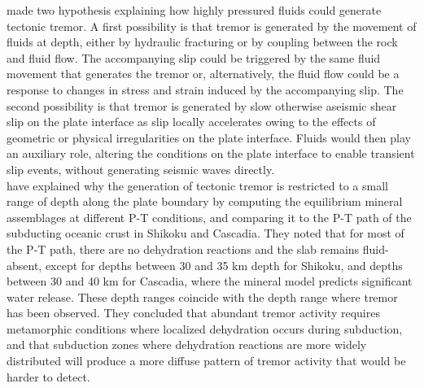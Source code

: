 \documentclass[draft]{agujournal2019}
\begin{document}
 made two hypothesis explaining how highly pressured fluids could generate tectonic tremor. A first possibility is that tremor is generated by the movement of fluids at depth, either by hydraulic fracturing or by coupling between the rock and fluid flow. The accompanying slip could be triggered by the same fluid movement that generates the tremor or, alternatively, the fluid flow could be a response to changes in stress and strain induced by the accompanying slip. The second possibility is that tremor is generated by slow otherwise aseismic shear slip on the plate interface as slip locally accelerates owing to the effects of geometric or physical irregularities on the plate interface. Fluids would then play an auxiliary role, altering the conditions on the plate interface to enable transient slip events, without generating seismic waves directly. \\

 have explained why the generation of tectonic tremor is restricted to a small range of depth along the plate boundary by computing the equilibrium mineral assemblages at different P-T conditions, and comparing it to the P-T path of the subducting oceanic crust in Shikoku and Cascadia. They noted that for most of the P-T path, there are no dehydration reactions and the slab remains fluid-absent, except for depths between 30 and 35 km depth for Shikoku, and depths between 30 and 40 km for Cascadia, where the mineral model predicts significant water release. These depth ranges coincide with the depth range where tremor has been observed. They concluded that abundant tremor activity requires metamorphic conditions where localized dehydration occurs during subduction, and that subduction zones where dehydration reactions are more widely distributed will produce a more diffuse pattern of tremor activity that would be harder to detect. \\
\end{document}

